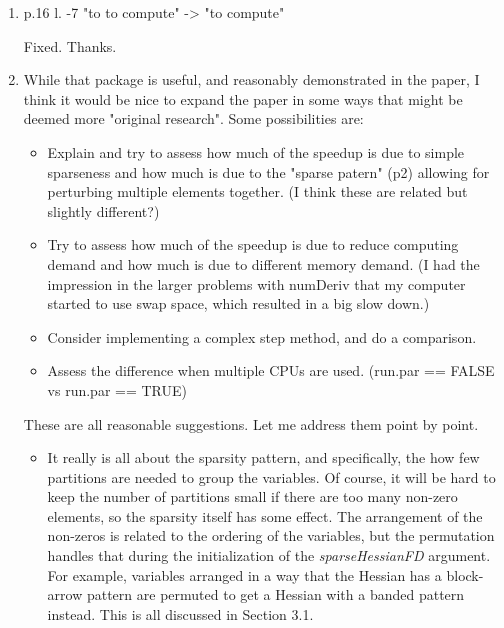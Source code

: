 \documentclass{article}
\newcommand{\class}[1]{\textsl{#1}}
\newenvironment{revQuote}{\itshape}{\vspace{\baselineskip}}
\newenvironment{response}{\normalfont}{\vspace{\baselineskip}}
\begin{document}
\begin{enumerate}[align=left]
\item\begin{revQuote}

 p.16  l. -7 "to to compute" -> "to compute"


  \end{revQuote}
  
  \begin{response}
    Fixed.  Thanks.
  \end{response}

\item\begin{revQuote}

While that package is useful, and reasonably demonstrated in the paper,
I think it would be nice to expand the paper in some ways that might be
deemed more "original research". Some possibilities are:
\begin{itemize}
 \item Explain and try to assess how much of the speedup is due to simple
sparseness and how much is due to the "sparse patern" (p2) allowing for
perturbing multiple elements together. (I think these are related but
slightly different?)
 
 \item Try to assess how much of the speedup is due to reduce computing demand
and how much is due to different memory demand. (I had the impression in the
larger problems with numDeriv that my computer started to use swap space,
which resulted in a big slow down.)
 
 \item Consider implementing a complex step method, and do a comparison.
 
 \item  Assess the difference when multiple CPUs are used. (run.par == FALSE vs
run.par == TRUE)
\end{itemize}
  \end{revQuote}
  
  \begin{response}
These are all reasonable suggestions.  Let me address them point by point.
    \begin{itemize}
    \item It really is all about the sparsity pattern, and
      specifically, the how few partitions are needed to group the
      variables.  Of course, it will be hard to keep the number of
      partitions small if there are too many non-zero elements, so the
      sparsity itself has some effect.  The arrangement of the non-zeros is
      related to the ordering of the variables, but the permutation
      handles that during the initialization of the
      \class{sparseHessianFD} argument.  For example, variables
      arranged in a way that the Hessian has a block-arrow pattern are
      permuted to get a Hessian with a banded pattern instead.  This
      is all discussed in Section 3.1.
      

\end{itemize}
\end{response}
\end{enumerate}
\end{document}

